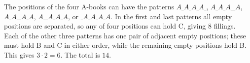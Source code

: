 The positions of the four A-books can have the patterns $A\_A\_A\_A\_$, $A\_A\_A\_\_A$, $A\_A\_\_A\_A$, $A\_\_A\_A\_A$, or $\_A\_A\_A\_A$. In the first and last patterns all empty positions are separated, so any of four positions can hold C, giving $8$ fillings. Each of the other three patterns has one pair of adjacent empty positions; these must hold B and C in either order, while the remaining empty positions hold B. This gives $3\cdot2=6$. The total is $\boxed{14}$.
